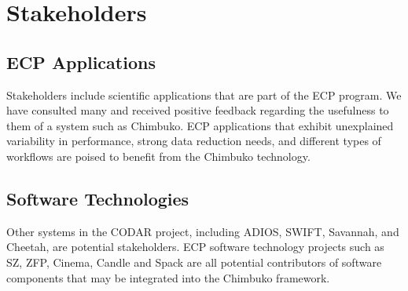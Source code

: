 \section{Stakeholders}

\subsection{ECP Applications}
Stakeholders include scientific applications that are part of the ECP program. We have consulted many and received positive feedback regarding the usefulness to them of a system such as Chimbuko. ECP applications that exhibit unexplained variability in performance, strong data reduction needs, and different types of workflows are poised to benefit from the Chimbuko technology.

\subsection{Software Technologies}					
Other systems in the CODAR project, including ADIOS, SWIFT, Savannah, and Cheetah, are potential stakeholders.  ECP software technology  projects such as SZ, ZFP, Cinema,  Candle and Spack are all potential contributors of software components that may be integrated into the Chimbuko framework.


